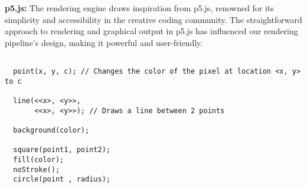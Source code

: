 \textbf{p5.js:} The rendering engine draws inspiration from p5.js, renowned for its simplicity and accessibility in the creative coding community. The straightforward approach to rendering and graphical output in p5.js has influenced our rendering pipeline's design, making it powerful and user-friendly.













\begin{lstlisting}

  point(x, y, c); // Changes the color of the pixel at location <x, y> to c

  line(<<x>, <y>>, 
       <<x>, <y>>); // Draws a line between 2 points

  background(color);

  square(point1, point2);
  fill(color);
  noStroke();
  circle(point , radius);

\end{lstlisting}








%   









